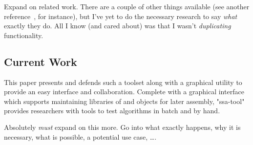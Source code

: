 \begin{draftvspace}{5in}
  Expand on related work.
  There are a couple of other things available
    (see another reference~\autocite{lafon:libcircle}, for instance),
    but I've yet to do the necessary research to say \emph{what} exactly they do.
  All I know (and cared about) was that I wasn't \emph{duplicating} functionality.
\end{draftvspace}

\subsection{Current Work}
\label{sec:introduction:current-work}
This paper presents and defends such a toolset
  along with a graphical utility to provide an easy interface and collaboration.
Complete with a graphical interface which supports
  maintaining libraries of  and  objects for later assembly,
  "ssa-tool" provides researchers with tools to test algorithms in batch and by hand.
\begin{draftvspace}{4in}
  Absolutely \emph{must} expand on this more.
  Go into what exactly happens, why it is necessary, what is possible, a potential use case, \dots.
\end{draftvspace}


